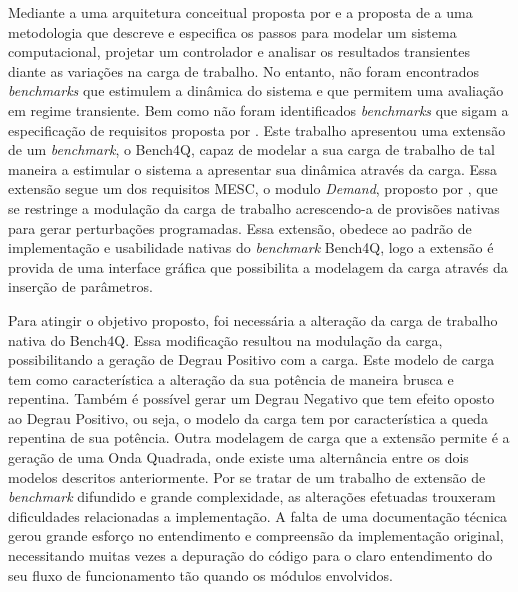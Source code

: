 Mediante a uma arquitetura conceitual proposta por  e a proposta de   a uma metodologia que descreve e especifica os passos para modelar um sistema computacional, projetar um controlador e analisar os resultados transientes diante as variações na carga de trabalho. No entanto, não foram encontrados \textit{benchmarks} que estimulem a dinâmica do sistema e que permitem uma avaliação em regime transiente. Bem como não foram identificados \textit{benchmarks} que sigam a especificação de requisitos proposta por .
Este trabalho apresentou uma extensão de um \textit{benchmark}, o Bench4Q, capaz de modelar a sua carga de trabalho de tal maneira a estimular o sistema a apresentar sua dinâmica através da carga. Essa extensão segue um dos requisitos MESC, o modulo \textit{Demand}, proposto por , que se restringe a modulação da carga de trabalho acrescendo-a de provisões nativas para gerar perturbações programadas. Essa extensão, obedece ao padrão de implementação e usabilidade nativas do \textit{benchmark} Bench4Q, logo a extensão é provida de uma interface gráfica que possibilita a modelagem da carga através da inserção de parâmetros.

Para atingir o objetivo proposto, foi necessária a alteração da carga de trabalho nativa do Bench4Q. Essa modificação resultou na modulação da carga, possibilitando a geração de Degrau Positivo com a carga. Este modelo de carga tem como característica a alteração da sua potência de maneira brusca e repentina. Também é possível gerar um Degrau Negativo que tem efeito oposto ao Degrau Positivo, ou seja, o modelo da carga tem por característica a queda repentina de sua potência. Outra modelagem de carga que a extensão permite é a geração de uma Onda Quadrada, onde existe uma alternância entre os dois modelos descritos anteriormente. 
Por se tratar de um trabalho de extensão de \textit{benchmark} difundido e grande complexidade, as alterações efetuadas trouxeram dificuldades relacionadas a implementação. A falta de uma documentação técnica gerou grande esforço no entendimento e compreensão da implementação original, necessitando muitas vezes a depuração do código para o claro entendimento do seu fluxo de funcionamento tão quando os módulos envolvidos.


